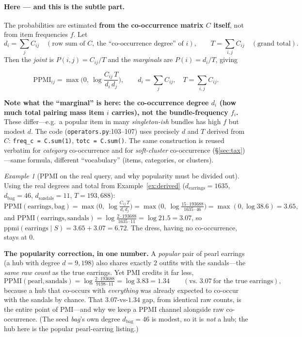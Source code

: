 \documentclass[11pt]{article}
\theoremstyle{remark}
\newtheorem{example}{Example}
\newcommand{\code}[1]{\texttt{\small #1}}
\begin{document}
\paragraph{Here --- and this is the subtle part.} The probabilities are estimated \textbf{from the co-occurrence
matrix $C$ itself}, not from item frequencies $f$. Let
\[
  d_i=\sum_{j}C_{ij}\quad(\text{row sum of }C,\ \text{the ``co-occurrence degree'' of }i),\qquad
  T=\sum_{i,j}C_{ij}\quad(\text{grand total}).
\]
Then the \emph{joint} is $P(i,j)=C_{ij}/T$ and the \emph{marginals} are $P(i)=d_i/T$, giving
\begin{keybox}
\[
  \mathrm{PPMI}_{ij}=\max\!\Big(0,\ \log\frac{C_{ij}\,T}{d_i\,d_j}\Big),\qquad
  d_i=\textstyle\sum_j C_{ij},\quad T=\sum_{i,j}C_{ij}.
\]
\end{keybox}
\textbf{Note what the ``marginal'' is here: the co-occurrence degree $d_i$ (how much total pairing mass item $i$
carries), not the bundle-frequency $f_i$.} These differ---e.g.\ a popular item in many \emph{singleton-ish} bundles
has high $f$ but modest $d$. The code (\code{operators.py}:103--107) uses precisely $d$ and $T$ derived from $C$:
\code{freq\_c = C.sum(1)}, \code{totc = C.sum()}. The same construction is reused verbatim for \emph{category}
co-occurrence and for \emph{soft-cluster} co-occurrence (\S\ref{sec:tax})---same formula, different ``vocabulary''
(items, categories, or clusters).

\begin{example}[PPMI on the real query, and why popularity must be divided out]\label{ex:ppmi}
Using the real degrees and total from Example~\ref{ex:derived} ($d_{\text{earrings}}=1635$, $d_{\text{bag}}=46$,
$d_{\text{sandals}}=11$, $T=193{,}688$):
\[
  \mathrm{PPMI}(\text{earrings},\text{bag})=\max\!\Big(0,\ \log\tfrac{C_{ij}\,T}{d_i\,d_j}\Big)
  =\max\!\Big(0,\ \log\tfrac{15\cdot 193688}{1635\cdot 46}\Big)=\max(0,\log 38.6)=\mathbf{3.65},
\]
and $\mathrm{PPMI}(\text{earrings},\text{sandals})=\log\tfrac{2\cdot 193688}{1635\cdot 11}=\log 21.5=3.07$, so
$\mathrm{ppmi}(\text{earrings}\mid S)=3.65+3.07=\mathbf{6.72}$. The dress, having no co-occurrence, stays at $0$.

\noindent\textbf{The popularity correction, in one number.} A \emph{popular} pair of pearl earrings (a hub with
degree $d=9{,}198$) also shares exactly $2$ outfits with the sandals---the \emph{same raw count} as the true
earrings. Yet PMI credits it far less,
\[
  \mathrm{PPMI}(\text{pearl},\text{sandals})=\log\tfrac{2\cdot 193688}{9198\cdot 11}=\log 3.83=\mathbf{1.34}
  \qquad(\text{vs.\ } 3.07\ \text{for the true earrings}),
\]
because a hub that co-occurs with \emph{everything} was already expected to co-occur with the sandals by chance.
That $3.07$-vs-$1.34$ gap, from identical raw counts, is the entire point of PMI---and why we keep a PPMI channel
alongside raw co-occurrence. (The seed \emph{bag}'s own degree $d_{\text{bag}}=46$ is modest, so it is \emph{not}
a hub; the hub here is the popular pearl-earring listing.)
\end{example}
\end{document}
